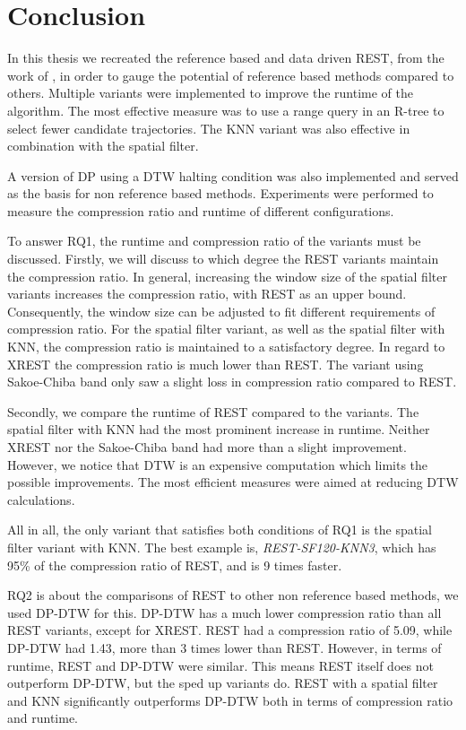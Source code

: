 \chapter{Conclusion}\label{chap:conclusion}
In this thesis we recreated the reference based and data driven REST, from the work of \textcite{zhao2018rest}, in order to gauge the potential of reference based methods compared to others. Multiple variants were implemented to improve the runtime of the algorithm. The most effective measure was to use a range query in an R-tree to select fewer candidate trajectories. The KNN variant was also effective in combination with the spatial filter.

A version of DP using a DTW halting condition was also implemented and served as the basis for non reference based methods. Experiments were performed to measure the compression ratio and runtime of different configurations.

To answer RQ1, the runtime and compression ratio of the variants must be discussed. Firstly, we will discuss to which degree the REST variants maintain the compression ratio. In general, increasing the window size of the spatial filter variants increases the compression ratio, with REST as an upper bound. Consequently, the window size can be adjusted to fit different requirements of compression ratio. For the spatial filter variant, as well as the spatial filter with KNN, the compression ratio is maintained to a satisfactory degree. In regard to XREST the compression ratio is much lower than REST. The variant using Sakoe-Chiba band only saw a slight loss in compression ratio compared to REST.

Secondly, we compare the runtime of REST compared to the variants. The spatial filter with KNN had the most prominent increase in runtime. Neither XREST nor the Sakoe-Chiba band had more than a slight improvement. However, we notice that DTW is an expensive computation which limits the possible improvements. The most efficient measures were aimed at reducing DTW calculations.

All in all, the only variant that satisfies both conditions of RQ1 is the spatial filter variant with KNN. The best example is, \textit{REST-SF120-KNN3}, which has 95\% of the compression ratio of REST, and is 9 times faster.

RQ2 is about the comparisons of REST to other non reference based methods, we used DP-DTW for this. DP-DTW has a much lower compression ratio than all REST variants, except for XREST. REST had a compression ratio of 5.09, while DP-DTW had 1.43, more than 3 times lower than REST. However, in terms of runtime, REST and DP-DTW were similar. This means REST itself does not outperform DP-DTW, but the sped up variants do. REST with a spatial filter and KNN significantly outperforms DP-DTW both in terms of compression ratio and runtime.

